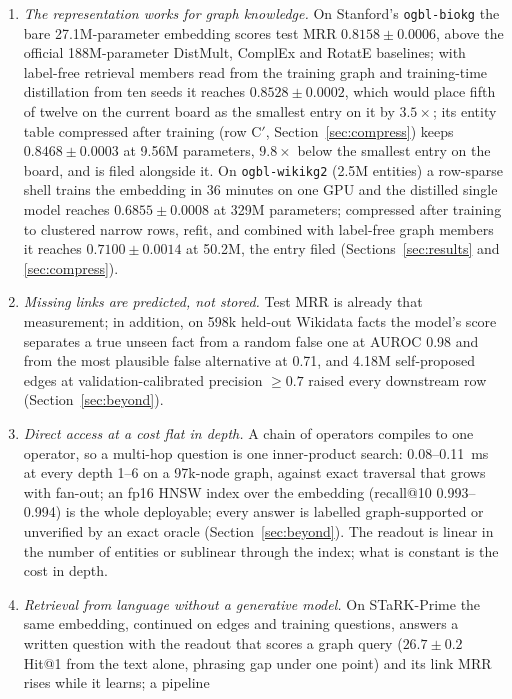 \documentclass[11pt,a4paper]{article}
\begin{document}
\begin{enumerate}
\item \emph{The representation works for graph knowledge.} On
Stanford's \texttt{ogbl-biokg} \citep{hu2020ogb} the bare 27.1M-parameter
embedding scores test MRR $0.8158\pm0.0006$, above the official
188M-parameter DistMult, ComplEx and RotatE baselines; with label-free
retrieval members read from the training graph and training-time
distillation from ten seeds it reaches $0.8528\pm0.0002$, which would
place fifth of twelve on the current board as the smallest entry on it by
$3.5\times$; its entity table compressed after training (row C$'$,
Section~\ref{sec:compress}) keeps $0.8468\pm0.0003$ at 9.56M parameters,
$9.8\times$ below the smallest entry on the board, and is filed alongside
it. On
\texttt{ogbl-wikikg2} (2.5M entities) a row-sparse shell trains the
embedding in 36 minutes on one GPU and the distilled single model reaches
$0.6855\pm0.0008$ at 329M parameters; compressed after training to
clustered narrow rows, refit, and combined with label-free graph members it
reaches $0.7100\pm0.0014$ at 50.2M, the entry filed
(Sections~\ref{sec:results} and \ref{sec:compress}).
\item \emph{Missing links are predicted, not stored.} Test MRR is
already that measurement; in addition, on 598k held-out Wikidata facts
the model's score separates a true unseen fact from a random false one at
AUROC 0.98 and from the most plausible false alternative at 0.71, and
4.18M self-proposed edges at validation-calibrated precision $\ge0.7$
raised every downstream row (Section~\ref{sec:beyond}).
\item \emph{Direct access at a cost flat in depth.} A chain of operators
compiles to one operator, so a multi-hop question is one inner-product
search: 0.08--0.11~ms at every depth 1--6 on a 97k-node graph, against
exact traversal that grows with fan-out; an fp16 HNSW index over the
embedding (recall@10 0.993--0.994) is the whole deployable; every answer is
labelled graph-supported or unverified by an exact oracle
(Section~\ref{sec:beyond}). The readout is linear in the number of entities or
sublinear through the index; what is constant is the cost in depth.
\item \emph{Retrieval from language without a generative model.} On
STaRK-Prime \citep{wu2024stark} the same embedding, continued on edges and
training questions, answers a written question with the readout that
scores a graph query ($26.7\pm0.2$ Hit@1 from the text alone, phrasing
gap under one point) and its link MRR rises while it learns; a pipeline

\end{enumerate}
\end{document}
